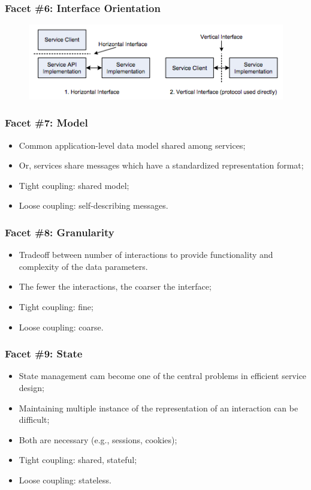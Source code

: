 \documentclass{beamer}
\begin{document}
\begin{frame}
    \frametitle{Facet \#6: Interface Orientation}
    \begin{figure}
        \centering
        \includegraphics[width=0.8\paperwidth]{fig2.png}
    \end{figure}
\end{frame}

\begin{frame}
    \frametitle{Facet \#7: Model}
    \begin{itemize}
        \item Common application-level data model shared among services;
        \item Or, services share messages which have a standardized representation format;
        \item Tight coupling: shared model;
        \item Loose coupling: self-describing messages.
    \end{itemize}
\end{frame}

\begin{frame}
    \frametitle{Facet \#8: Granularity}
    \begin{itemize}
        \item Tradeoff between number of interactions to provide functionality and complexity of the data parameters.
        \item The fewer the interactions, the coarser the interface;
        \item Tight coupling: fine;
        \item Loose coupling: coarse.
    \end{itemize}
\end{frame}

\begin{frame}
    \frametitle{Facet \#9: State}
    \begin{itemize}
        \item State management cam become one of the central problems in efficient service design;
        \item Maintaining multiple instance of the representation of an interaction can be difficult;
        \item Both are necessary (e.g., sessions, cookies);
        \item Tight coupling: shared, stateful;
        \item Loose coupling: stateless.
    \end{itemize}
\end{frame}
\end{document}
